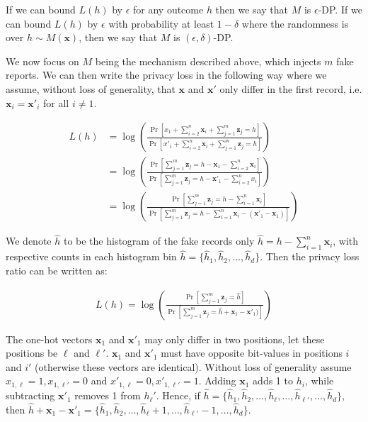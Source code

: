 \documentclass[11pt]{article}
\newcommand{\bbx}{\pmb{x}}
\newcommand{\bbz}{\pmb{z}}
\begin{document}
If we can bound $L(h)$ by $\epsilon$ for any outcome $h$ then we say that $M$ is $\epsilon$-DP. If we can bound $L(h)$ by $\epsilon$ with probability at least $1 - \delta$ where the randomness is over $h \sim M(\bbx)$, then we say that $M$ is $(\epsilon, \delta)$-DP.

We now focus on $M$ being the mechanism described above, which injects $m$ fake reports. We can then write the privacy loss in the following way where we assume, without loss of generality, that $\bbx$ and $\bbx'$ only differ in the first record, i.e. $\bbx_i = \bbx'_i$ for all $i \ne 1$.

\begin{align*}
L(h) &= \log \left ( \frac{\Pr[x_1 + \sum^n_{i=2} \bbx_i + \sum^m_{j=1} \bbz_j = h]}{\Pr[x'_1 + \sum^n_{i=2} \bbx_i + \sum^m_{j=1} \bbz_j = h]} \right ) \\
&=  \log \left ( \frac{\Pr[\sum^m_{j=1} \bbz_j = h - \bbx_1 - \sum^n_{i=2} \bbx_i ]}{\Pr[ \sum^m_{j=1} \bbz_j = h - \bbx'_1 - \sum^n_{i=2} x_i ]} \right )  \\
&=  \log \left ( \frac{\Pr[\sum^m_{j=1} \bbz_j = h - \sum^n_{i=1}  \bbx_i ]}{\Pr[ \sum^m_{j=1} \bbz_j = h  - \sum^n_{i=1} \bbx_i  - (\bbx'_1 - \bbx_1) ]} \right )
\end{align*}

We denote  $\hat{h}$ to be the histogram of the fake records only $\hat{h} = h - \sum^n_{i=1} \bbx_i$, with respective counts in each histogram bin $\hat{h} = \{ \hat{h}_1, \hat{h}_2, \dots , \hat{h}_d\}$.  Then the privacy loss ratio can be written as:

\begin{align*}
L(h) =  \log \left ( \frac{\Pr[\sum^m_{j=1} \bbz_j = \hat{h} ]}{\Pr[ \sum^m_{j=1} \bbz_j = \hat{h}  + \bbx_1 - \bbx'_1) ]} \right )
\end{align*}



The one-hot vectors $\bbx_1$  and $\bbx'_1$ may only differ in two positions, let these positions be $\ell$ and $\ell'$. 
$\bbx_1$ and $\bbx'_1$ must have opposite bit-values in positions $i$ and $i'$ (otherwise these vectors are identical). 
Without loss of generality assume $x_{1,\ell} = 1, x_{1,\ell'} = 0$ and $x'_{1,\ell} = 0, x'_{1,\ell'} = 1$.  
Adding $\bbx_1$ adds 1 to $h_i$, while subtracting $\bbx'_1$ removes 1 from $h_\ell'$.
Hence,  if $\hat{h} = \{ \hat{h}_1, \hat{h}_2, \dots , \hat{h}_\ell, \dots, \hat{h}_{\ell'}, \dots, \hat{h}_d\} $, then  $\hat{h} + \bbx_1 -\bbx'_1 =  \{ \hat{h}_1, \hat{h}_2, \dots , \hat{h}_\ell + 1, \dots, \hat{h}_{\ell'} -1, \dots, \hat{h}_d\} $.
\end{document}
